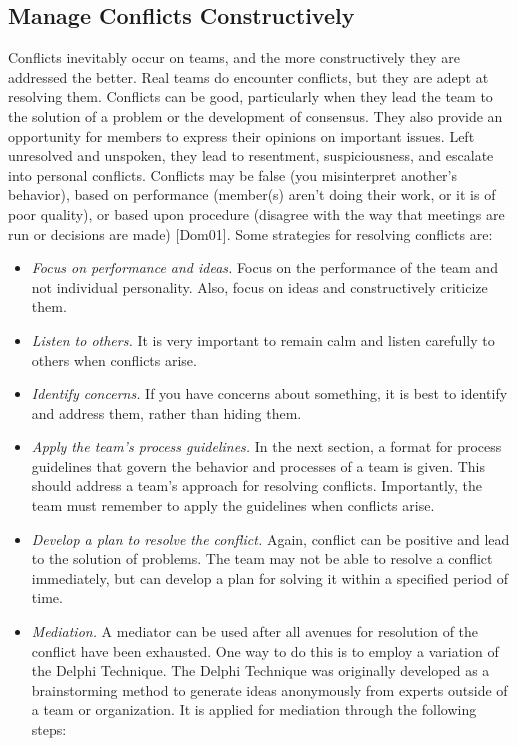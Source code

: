 \subsection{Manage Conflicts Constructively}
\label{subsection:manage-conflicts-constructively}

Conflicts inevitably occur on teams, and the more constructively they
are addressed the better. Real teams do encounter conflicts, but they
are adept at resolving them. Conflicts can be good, particularly when
they lead the team to the solution of a problem or the development of
consensus. They also provide an opportunity for members to express their
opinions on important issues. Left unresolved and unspoken, they lead to
resentment, suspiciousness, and escalate into personal conflicts.
Conflicts may be false (you misinterpret another's behavior), based on
performance (member(s) aren't doing their work, or it is of poor
quality), or based upon procedure (disagree with the way that meetings
are run or decisions are made) {[}Dom01{]}. Some strategies for
resolving conflicts are:

\begin{itemize}
\item
  \emph{Focus on performance and ideas.} Focus on the performance of the
  team and not individual personality. Also, focus on ideas and
  constructively criticize them.
\item
  \emph{Listen to others.} It is very important to remain calm and
  listen carefully to others when conflicts arise.
\item
  \emph{Identify concerns.} If you have concerns about something, it is
  best to identify and address them, rather than hiding them.
\item
  \emph{Apply the team's process guidelines.} In the next section, a
  format for process guidelines that govern the behavior and processes
  of a team is given. This should address a team's approach for
  resolving conflicts. Importantly, the team must remember to apply the
  guidelines when conflicts arise.
\item
  \emph{Develop a plan to resolve the conflict.} Again, conflict can be
  positive and lead to the solution of problems. The team may not be
  able to resolve a conflict immediately, but can develop a plan for
  solving it within a specified period of time.
\item
  \emph{Mediation.} A mediator can be used after all avenues for
  resolution of the conflict have been exhausted. One way to do this is
  to employ a variation of the Delphi Technique. The Delphi Technique
  was originally developed as a brainstorming method to generate ideas
  anonymously from experts outside of a team or organization. It is
  applied for mediation through the following steps:
\end{itemize}

